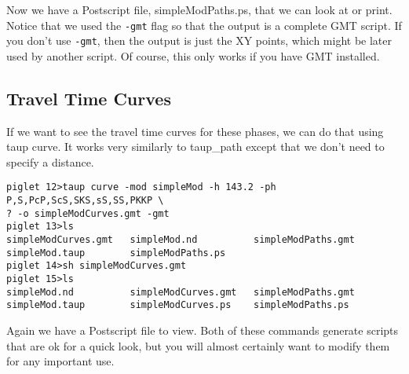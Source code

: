 Now we have a Postscript file, simpleModPaths.ps, that we can look at or print.
Notice that we used the \texttt{-gmt} flag so that the output is a complete
GMT script. If you don't use \texttt{-gmt}, then the output is just the XY
points, which might be later used by another script.
Of course, this only works if you have GMT installed.

\subsection{Travel Time Curves}

If we want to see the travel time curves for these phases, we can do that using
taup curve. It works very similarly to taup\_path except that we don't need to
specify a distance.

\begin{verbatim}
piglet 12>taup curve -mod simpleMod -h 143.2 -ph P,S,PcP,ScS,SKS,sS,SS,PKKP \
? -o simpleModCurves.gmt -gmt
piglet 13>ls
simpleModCurves.gmt   simpleMod.nd          simpleModPaths.gmt
simpleMod.taup        simpleModPaths.ps
piglet 14>sh simpleModCurves.gmt
piglet 15>ls
simpleMod.nd          simpleModCurves.gmt   simpleModPaths.gmt
simpleMod.taup        simpleModCurves.ps    simpleModPaths.ps
\end{verbatim}

Again we have a Postscript file to view. Both of these commands generate scripts
that are ok for a quick look, but you will almost certainly want to modify
them for any important use.
